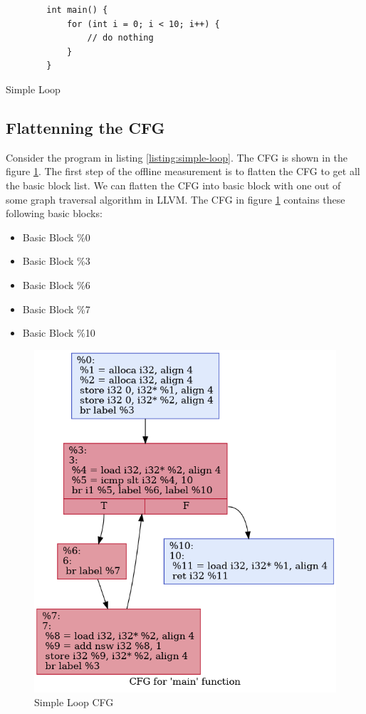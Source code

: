\begin{listing}[htbp]
    \begin{verbatim}
        int main() {
            for (int i = 0; i < 10; i++) {
                // do nothing
            }
        }
    \end{verbatim}
    \caption{Simple Loop}    
    \label{listing:simple-loop}
\end{listing}

\subsection{Flattenning the CFG}

Consider the program in listing \ref{listing:simple-loop}. The CFG is shown in the figure \ref{fig:simple-loop-cfg}. The first step of the offline measurement is to flatten the CFG to get all the basic block list. We can flatten the CFG into basic block with one out of some graph traversal algorithm in LLVM. The CFG in figure \ref{fig:simple-loop-cfg} contains these following basic blocks:

\begin{itemize}
    \item Basic Block \%0
    \item Basic Block \%3
    \item Basic Block \%6
    \item Basic Block \%7
    \item Basic Block \%10
\end{itemize}


\begin{figure}[htbp]
\centerline{\includegraphics[scale=.5]{Figures/04/simple-loop.png}}
\caption{Simple Loop CFG}
\label{fig:simple-loop-cfg}
\end{figure}

